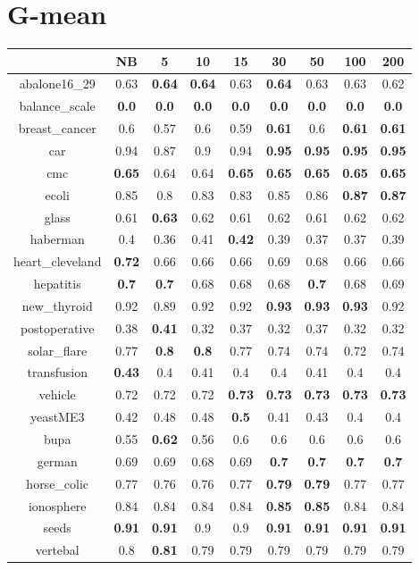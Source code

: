 \documentclass{article}%
\begin{document}
%
\section*{G{-}mean}%
\begin{tabular}{c|cccccccc}%
\hline%
&NB&5&10&15&30&50&100&200\\%
\hline%
abalone16\_29&0.63&\textbf{0.64}&\textbf{0.64}&0.63&\textbf{0.64}&0.63&0.63&0.62\\%
\hline%
balance\_scale&\textbf{0.0}&\textbf{0.0}&\textbf{0.0}&\textbf{0.0}&\textbf{0.0}&\textbf{0.0}&\textbf{0.0}&\textbf{0.0}\\%
\hline%
breast\_cancer&0.6&0.57&0.6&0.59&\textbf{0.61}&0.6&\textbf{0.61}&\textbf{0.61}\\%
\hline%
car&0.94&0.87&0.9&0.94&\textbf{0.95}&\textbf{0.95}&\textbf{0.95}&\textbf{0.95}\\%
\hline%
cmc&\textbf{0.65}&0.64&0.64&\textbf{0.65}&\textbf{0.65}&\textbf{0.65}&\textbf{0.65}&\textbf{0.65}\\%
\hline%
ecoli&0.85&0.8&0.83&0.83&0.85&0.86&\textbf{0.87}&\textbf{0.87}\\%
\hline%
glass&0.61&\textbf{0.63}&0.62&0.61&0.62&0.61&0.62&0.62\\%
\hline%
haberman&0.4&0.36&0.41&\textbf{0.42}&0.39&0.37&0.37&0.39\\%
\hline%
heart\_cleveland&\textbf{0.72}&0.66&0.66&0.66&0.69&0.68&0.66&0.66\\%
\hline%
hepatitis&\textbf{0.7}&\textbf{0.7}&0.68&0.68&0.68&\textbf{0.7}&0.68&0.69\\%
\hline%
new\_thyroid&0.92&0.89&0.92&0.92&\textbf{0.93}&\textbf{0.93}&\textbf{0.93}&0.92\\%
\hline%
postoperative&0.38&\textbf{0.41}&0.32&0.37&0.32&0.37&0.32&0.32\\%
\hline%
solar\_flare&0.77&\textbf{0.8}&\textbf{0.8}&0.77&0.74&0.74&0.72&0.74\\%
\hline%
transfusion&\textbf{0.43}&0.4&0.41&0.4&0.4&0.41&0.4&0.4\\%
\hline%
vehicle&0.72&0.72&0.72&\textbf{0.73}&\textbf{0.73}&\textbf{0.73}&\textbf{0.73}&\textbf{0.73}\\%
\hline%
yeastME3&0.42&0.48&0.48&\textbf{0.5}&0.41&0.43&0.4&0.4\\%
\hline%
bupa&0.55&\textbf{0.62}&0.56&0.6&0.6&0.6&0.6&0.6\\%
\hline%
german&0.69&0.69&0.68&0.69&\textbf{0.7}&\textbf{0.7}&\textbf{0.7}&\textbf{0.7}\\%
\hline%
horse\_colic&0.77&0.76&0.76&0.77&\textbf{0.79}&\textbf{0.79}&0.77&0.77\\%
\hline%
ionosphere&0.84&0.84&0.84&0.84&\textbf{0.85}&\textbf{0.85}&0.84&0.84\\%
\hline%
seeds&\textbf{0.91}&\textbf{0.91}&0.9&0.9&\textbf{0.91}&\textbf{0.91}&\textbf{0.91}&\textbf{0.91}\\%
\hline%
vertebal&0.8&\textbf{0.81}&0.79&0.79&0.79&0.79&0.79&0.79\\%
\hline%
\end{tabular}

%
\end{document}
